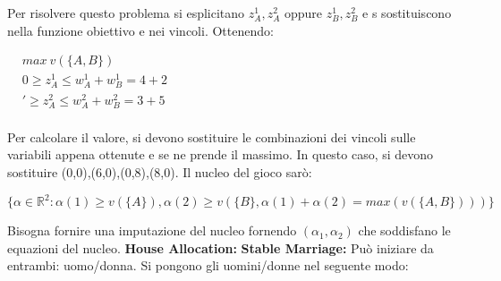 \documentclass{article}
\theoremstyle{definition}
\theoremstyle{remark}
\begin{document}
Per risolvere questo problema si esplicitano \(z_A^1,z_A^2\) oppure \(z_B^1,z_B^2\) e s sostituiscono nella funzione obiettivo e nei vincoli. Ottenendo:
\begin{center}
    $\begin{aligned}
        & max\ v(\{A,B\})\\
        & 0\geq z_A^1\leq w_A^1+w_B^1=4+2\\
        & '\geq z_A^2\leq w_A^2+w_B^2=3+5\\
    \end{aligned}$
\end{center}
Per calcolare il valore, si devono sostituire le combinazioni dei vincoli sulle variabili appena ottenute e se ne prende il massimo.\newline
In questo caso, si devono sostituire (0,0),(6,0),(0,8),(8,0).\newline
Il nucleo del gioco sarò:
\begin{center}
    \(\{\alpha\in\mathbb{R}^2:\alpha(1)\geq v(\{A\}),\alpha(2)\geq v(\{B\},\alpha(1)+\alpha(2)=max(v(\{A,B\})))\}\)
\end{center}
Bisogna fornire una imputazione del nucleo fornendo \((\alpha_1,\alpha_2)\) che soddisfano le equazioni del nucleo.
\textbf{House Allocation:}\newline
\textbf{Stable Marriage:} Può iniziare da entrambi: uomo/donna. Si pongono gli uomini/donne nel seguente modo:
\end{document}
